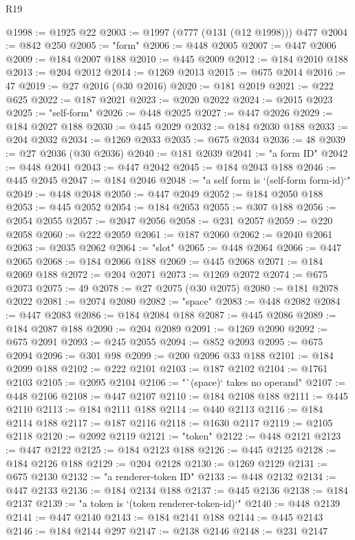 \begin{lexlean}{R19}
\begin{coremodule}
@1998 := @1925 @22
@2003 := @1997 (@777 (@131 (@12 @1998))) @477
@2004 := @842 @250
@2005 := "form"
@2006 := @448 @2005
@2007 := @447 @2006
@2009 := @184 @2007 @188
@2010 := @445 @2009
@2012 := @184 @2010 @188
@2013 := @204 @2012
@2014 := @1269 @2013
@2015 := @675 @2014
@2016 := 47
@2019 := @27 @2016 (@30 @2016)
@2020 := @181 @2019
@2021 := @222 @625
@2022 := @187 @2021
@2023 := @2020 @2022
@2024 := @2015 @2023
@2025 := "self-form"
@2026 := @448 @2025
@2027 := @447 @2026
@2029 := @184 @2027 @188
@2030 := @445 @2029
@2032 := @184 @2030 @188
@2033 := @204 @2032
@2034 := @1269 @2033
@2035 := @675 @2034
@2036 := 48
@2039 := @27 @2036 (@30 @2036)
@2040 := @181 @2039
@2041 := "a form ID"
@2042 := @448 @2041
@2043 := @447 @2042
@2045 := @184 @2043 @188
@2046 := @445 @2045
@2047 := @184 @2046
@2048 := "a self form is `(self-form form-id)`"
@2049 := @448 @2048
@2050 := @447 @2049
@2052 := @184 @2050 @188
@2053 := @445 @2052
@2054 := @184 @2053
@2055 := @307 @188
@2056 := @2054 @2055
@2057 := @2047 @2056
@2058 := @231 @2057
@2059 := @220 @2058
@2060 := @222 @2059
@2061 := @187 @2060
@2062 := @2040 @2061
@2063 := @2035 @2062
@2064 := "slot"
@2065 := @448 @2064
@2066 := @447 @2065
@2068 := @184 @2066 @188
@2069 := @445 @2068
@2071 := @184 @2069 @188
@2072 := @204 @2071
@2073 := @1269 @2072
@2074 := @675 @2073
@2075 := 49
@2078 := @27 @2075 (@30 @2075)
@2080 := @181 @2078 @2022
@2081 := @2074 @2080
@2082 := "space"
@2083 := @448 @2082
@2084 := @447 @2083
@2086 := @184 @2084 @188
@2087 := @445 @2086
@2089 := @184 @2087 @188
@2090 := @204 @2089
@2091 := @1269 @2090
@2092 := @675 @2091
@2093 := @245 @2055
@2094 := @852 @2093
@2095 := @675 @2094
@2096 := @301 @98
@2099 := @200 @2096 @33 @188
@2101 := @184 @2099 @188
@2102 := @222 @2101
@2103 := @187 @2102
@2104 := @1761 @2103
@2105 := @2095 @2104
@2106 := "`(space)` takes no operand"
@2107 := @448 @2106
@2108 := @447 @2107
@2110 := @184 @2108 @188
@2111 := @445 @2110
@2113 := @184 @2111 @188
@2114 := @440 @2113
@2116 := @184 @2114 @188
@2117 := @187 @2116
@2118 := @1630 @2117
@2119 := @2105 @2118
@2120 := @2092 @2119
@2121 := "token"
@2122 := @448 @2121
@2123 := @447 @2122
@2125 := @184 @2123 @188
@2126 := @445 @2125
@2128 := @184 @2126 @188
@2129 := @204 @2128
@2130 := @1269 @2129
@2131 := @675 @2130
@2132 := "a renderer-token ID"
@2133 := @448 @2132
@2134 := @447 @2133
@2136 := @184 @2134 @188
@2137 := @445 @2136
@2138 := @184 @2137
@2139 := "a token is `(token renderer-token-id)`"
@2140 := @448 @2139
@2141 := @447 @2140
@2143 := @184 @2141 @188
@2144 := @445 @2143
@2146 := @184 @2144 @297
@2147 := @2138 @2146
@2148 := @231 @2147

\end{coremodule}
\end{lexlean}
